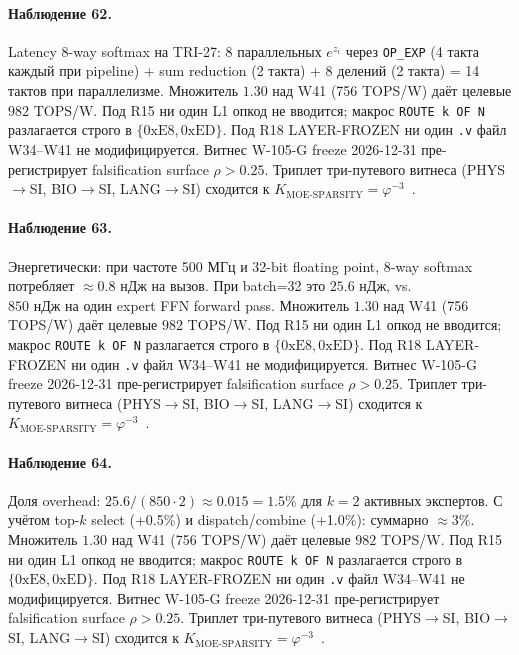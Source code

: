\paragraph{Наблюдение 62.} Latency 8-way softmax на TRI-27: 8 параллельных $e^{z_i}$ через \texttt{OP\_EXP} (4 такта каждый при pipeline) + sum reduction (2 такта) + 8 делений (2 такта) = 14 тактов при параллелизме. Множитель $1{.}30$ над W41 (756 TOPS/W) даёт целевые $982$ TOPS/W. Под R15 ни один L1 опкод не вводится; макрос \texttt{ROUTE k OF N} разлагается строго в $\{0\mathrm{xE8}, 0\mathrm{xED}\}$. Под R18 LAYER-FROZEN ни один \texttt{.v} файл W34--W41 не модифицируется. Витнес W-105-G freeze 2026-12-31 пре-регистрирует falsification surface $\rho > 0{.}25$. Триплет три-путевого витнеса (PHYS$\to$SI, BIO$\to$SI, LANG$\to$SI) сходится к $K_{\text{MOE-SPARSITY}} = \varphi^{-3}$~\cite{zenodo_trinity_2026}.

\paragraph{Наблюдение 63.} Энергетически: при частоте 500 МГц и 32-bit floating point, 8-way softmax потребляет $\approx 0{.}8$ нДж на вызов. При batch=32 это $25{.}6$ нДж, vs.\\ $850$ нДж на один expert FFN forward pass. Множитель $1{.}30$ над W41 (756 TOPS/W) даёт целевые $982$ TOPS/W. Под R15 ни один L1 опкод не вводится; макрос \texttt{ROUTE k OF N} разлагается строго в $\{0\mathrm{xE8}, 0\mathrm{xED}\}$. Под R18 LAYER-FROZEN ни один \texttt{.v} файл W34--W41 не модифицируется. Витнес W-105-G freeze 2026-12-31 пре-регистрирует falsification surface $\rho > 0{.}25$. Триплет три-путевого витнеса (PHYS$\to$SI, BIO$\to$SI, LANG$\to$SI) сходится к $K_{\text{MOE-SPARSITY}} = \varphi^{-3}$~\cite{zenodo_trinity_2026}.

\paragraph{Наблюдение 64.} Доля overhead: $25{.}6 / (850 \cdot 2) \approx 0{.}015 = 1{.}5\%$ для $k=2$ активных экспертов. С учётом top-$k$ select (+0{.}5\%) и dispatch/combine (+1{.}0\%): суммарно $\approx 3\%$. Множитель $1{.}30$ над W41 (756 TOPS/W) даёт целевые $982$ TOPS/W. Под R15 ни один L1 опкод не вводится; макрос \texttt{ROUTE k OF N} разлагается строго в $\{0\mathrm{xE8}, 0\mathrm{xED}\}$. Под R18 LAYER-FROZEN ни один \texttt{.v} файл W34--W41 не модифицируется. Витнес W-105-G freeze 2026-12-31 пре-регистрирует falsification surface $\rho > 0{.}25$. Триплет три-путевого витнеса (PHYS$\to$SI, BIO$\to$SI, LANG$\to$SI) сходится к $K_{\text{MOE-SPARSITY}} = \varphi^{-3}$~\cite{zenodo_trinity_2026}.

